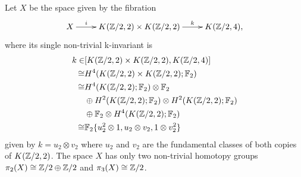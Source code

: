 Let $X$ be the space given by the fibration
$$\xymatrix{
X\ar[r]^-i &K(\Z/2,2)\times K(\Z/2,2)\ar[r]^-k &K(\Z/2,4),
}$$
where its single non-trivial k-invariant is
\begin{align*}
k \in& [K(\mathbb{Z}/2,2)\times K(\mathbb{Z}/2,2),K(\mathbb{Z}/2,4)]\\
\cong &H^4(K(\mathbb{Z}/2,2)\times K(\mathbb{Z}/2,2);\mathbb{F}_2)\\
\cong &H^4(K(\mathbb{Z}/2,2);\mathbb{F}_2)\otimes\mathbb{F}_2\\
&\oplus H^2(K(\mathbb{Z}/2,2);\mathbb{F}_2)\otimes H^2(K(\mathbb{Z}/2,2);\mathbb{F}_2)\\
&\oplus\mathbb{F}_2\otimes H^4(K(\mathbb{Z}/2,2);\mathbb{F}_2)\\
\cong &\mathbb{F}_2\{u_2^2\otimes1,u_2\otimes v_2,1\otimes v_2^2\}
\end{align*}
given by $k=u_2\otimes v_2$ where $u_2$ and $v_2$ are the fundamental classes of both copies of $K(\mathbb{Z}/2,2)$. The space $X$ has only two non-trivial homotopy groups $\pi_2(X)\cong\mathbb{Z}/2\oplus\mathbb{Z}/2$ and $\pi_3(X)\cong\mathbb{Z}/2$.
\endinput